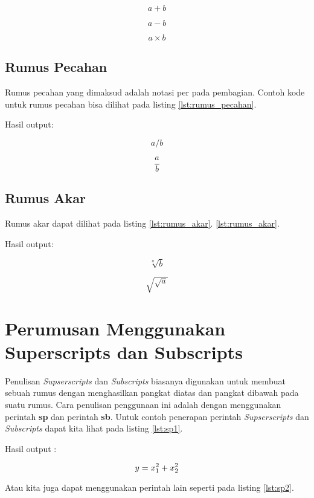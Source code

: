 $$ a+b$$

$$ a-b$$

$$ a \times b$$

\subsection{Rumus Pecahan}
Rumus pecahan yang dimaksud adalah notasi per pada pembagian. Contoh kode untuk rumus pecahan bisa dilihat pada listing \ref{lst:rumus_pecahan}.

Hasil output:

$$ a/b$$

$$ \frac {a}{b}$$

\subsection{Rumus Akar}
Rumus akar dapat dilihat pada listing \ref{lst:rumus_akar}.
\ref{lst:rumus_akar}.

Hasil output:

$$ \sqrt[a]{b}$$

$$ \sqrt{\sqrt{a}}$$

\section{Perumusan Menggunakan Superscripts dan Subscripts}
Penulisan \textit{Supserscripts} dan \textit{Subscripts} biasanya digunakan untuk membuat sebuah rumus dengan menghasilkan pangkat diatas dan pangkat dibawah pada suatu rumus. Cara penulisan penggunaan ini adalah dengan menggunakan perintah \textbf{sp} dan perintah \textbf{sb}. Untuk contoh penerapan perintah \textit{Supserscripts} dan \textit{Subscripts} dapat kita lihat pada listing \ref{lst:sp1}.



Hasil output :

\begin{displaymath}
y = x\sb{1}\sp{2} + x\sb{2}\sp{2}
\end{displaymath}

Atau kita juga dapat menggunakan perintah lain seperti pada listing \ref{lst:sp2}.




